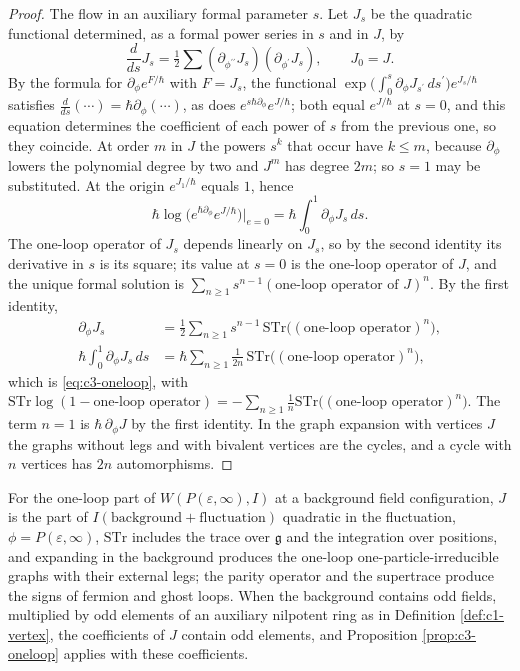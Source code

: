 \begin{proof}
The flow in an auxiliary formal parameter $s$. Let $J_s$ be the quadratic functional determined, as a formal power series in $s$ and in $J$, by
\[
\frac{d}{ds}J_s=\tfrac12\sum(\partial_{\phi^{\prime\prime}}J_s)(\partial_{\phi^{\prime}}J_s),\qquad J_0=J .
\]
By the formula for $\partial_\phi e^{F/\hbar}$ with $F=J_s$, the functional $\exp\big(\int_0^s\partial_\phi J_{s^{\prime}}\,ds^{\prime}\big)e^{J_s/\hbar}$ satisfies $\frac{d}{ds}(\cdots)=\hbar\partial_\phi(\cdots)$, as does $e^{s\hbar\partial_\phi}e^{J/\hbar}$; both equal $e^{J/\hbar}$ at $s=0$, and this equation determines the coefficient of each power of $s$ from the previous one, so they coincide. At order $m$ in $J$ the powers $s^k$ that occur have $k\le m$, because $\partial_\phi$ lowers the polynomial degree by two and $J^m$ has degree $2m$; so $s=1$ may be substituted. At the origin $e^{J_1/\hbar}$ equals $1$, hence
\[
\hbar\log\big(e^{\hbar\partial_\phi}e^{J/\hbar}\big)\Big|_{e=0}=\hbar\int_0^1\partial_\phi J_s\,ds .
\]
The one-loop operator of $J_s$ depends linearly on $J_s$, so by the second identity its derivative in $s$ is its square; its value at $s=0$ is the one-loop operator of $J$, and the unique formal solution is $\sum_{n\ge1}s^{n-1}(\text{one-loop operator of }J)^n$. By the first identity,
\[
\begin{aligned}
\partial_\phi J_s&=\tfrac12\sum_{n\ge1}s^{n-1}\,\mathrm{STr}\big((\text{one-loop operator})^n\big),\\
\hbar\int_0^1\partial_\phi J_s\,ds&=\hbar\sum_{n\ge1}\frac1{2n}\,\mathrm{STr}\big((\text{one-loop operator})^n\big),
\end{aligned}
\]
which is \eqref{eq:c3-oneloop}, with $\mathrm{STr}\log(1-\text{one-loop operator})=-\sum_{n\ge1}\frac1n\mathrm{STr}\big((\text{one-loop operator})^n\big)$. The term $n=1$ is $\hbar\,\partial_\phi J$ by the first identity. In the graph expansion with vertices $J$ the graphs without legs and with bivalent vertices are the cycles, and a cycle with $n$ vertices has $2n$ automorphisms.
\end{proof}

\begin{remark}
\label{rem:c3-oneloop}
For the one-loop part of $W(P(\varepsilon,\infty),I)$ at a background field configuration, $J$ is the part of $I(\text{background}+\text{fluctuation})$ quadratic in the fluctuation, $\phi=P(\varepsilon,\infty)$, $\mathrm{STr}$ includes the trace over $\mathfrak g$ and the integration over positions, and expanding in the background produces the one-loop one-particle-irreducible graphs with their external legs; the parity operator and the supertrace produce the signs of fermion and ghost loops. When the background contains odd fields, multiplied by odd elements of an auxiliary nilpotent ring as in Definition \ref{def:c1-vertex}, the coefficients of $J$ contain odd elements, and Proposition \ref{prop:c3-oneloop} applies with these coefficients.
\end{remark}
